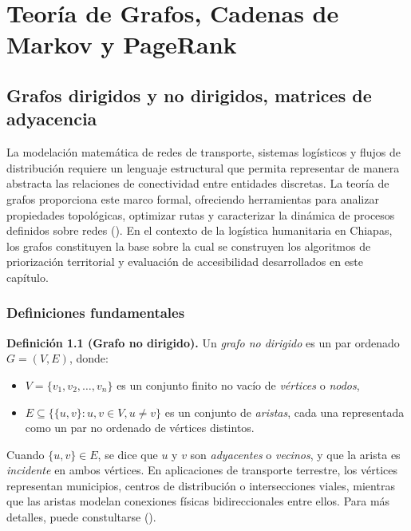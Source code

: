 \documentclass[
  spanish,
  us-letterpaper,
]{scrreprt}
\providecommand{\tightlist}{%
  \setlength{\itemsep}{0pt}\setlength{\parskip}{0pt}}
\numberwithin{equation}{section}
\begin{document}

\chapter{Teoría de Grafos, Cadenas de Markov y
PageRank}\label{teoruxeda-de-grafos-cadenas-de-markov-y-pagerank}

\section{Grafos dirigidos y no dirigidos, matrices de
adyacencia}\label{sec-grafosadyacencia}

La modelación matemática de redes de transporte, sistemas logísticos y
flujos de distribución requiere un lenguaje estructural que permita
representar de manera abstracta las relaciones de conectividad entre
entidades discretas. La teoría de grafos proporciona este marco formal,
ofreciendo herramientas para analizar propiedades topológicas, optimizar
rutas y caracterizar la dinámica de procesos definidos sobre redes
(). En el contexto de
la logística humanitaria en Chiapas, los grafos constituyen la base
sobre la cual se construyen los algoritmos de priorización territorial y
evaluación de accesibilidad desarrollados en este capítulo.

\subsection{Definiciones fundamentales}\label{sec-grafos}

\textbf{Definición 1.1 (Grafo no dirigido).} Un \emph{grafo no dirigido}
es un par ordenado \(G = (V, E)\), donde:

\begin{itemize}
\tightlist
\item
  \(V = \{v_1, v_2, \dots, v_n\}\) es un conjunto finito no vacío de
  \emph{vértices} o \emph{nodos},
\item
  \(E \subseteq \{\{u,v\} : u, v \in V, u \neq v\}\) es un conjunto de
  \emph{aristas}, cada una representada como un par no ordenado de
  vértices distintos.
\end{itemize}

Cuando \(\{u,v\} \in E\), se dice que \(u\) y \(v\) son
\emph{adyacentes} o \emph{vecinos}, y que la arista es \emph{incidente}
en ambos vértices. En aplicaciones de transporte terrestre, los vértices
representan municipios, centros de distribución o intersecciones viales,
mientras que las aristas modelan conexiones físicas bidireccionales
entre ellos. Para más detalles, puede constultarse
().
\end{document}
